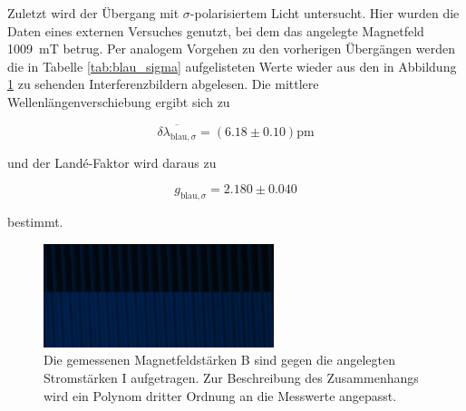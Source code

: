               Zuletzt wird der Übergang mit $\sigma$-polarisiertem Licht untersucht. Hier wurden die Daten eines externen Versuches genutzt, bei dem das angelegte Magnetfeld \SI{1009}{\milli\tesla} betrug. Per 
              analogem Vorgehen zu den vorherigen Übergängen werden die in Tabelle \ref{tab:blau_sigma} aufgelisteten Werte wieder aus
              den in Abbildung \ref{fig:blau_sigma} zu sehenden Interferenzbildern abgelesen. Die mittlere Wellenlängenverschiebung ergibt sich zu

            \begin{equation*}
              \overline{\delta \lambda_{\text{blau}, \sigma}} = \left(6.18 \pm 0.10\right)\si{\pico\metre}
            \end{equation*}

            und der Landé-Faktor wird daraus zu

            \begin{equation*}
              g_{\text{blau}, \sigma} = 2.180 \pm 0.040 
            \end{equation*}

            bestimmt.



              \FloatBarrier

              \begin{figure}[h]
                \centering
                \includegraphics[width = 0.6\textwidth]{pictures/blau_sigma.jpg}
                \caption{Die gemessenen Magnetfeldstärken B sind gegen die angelegten Stromstärken I aufgetragen. Zur Beschreibung des Zusammenhangs wird ein Polynom dritter Ordnung an die Messwerte angepasst.}
                \label{fig:blau_sigma}
              \end{figure}
          
              \FloatBarrier

